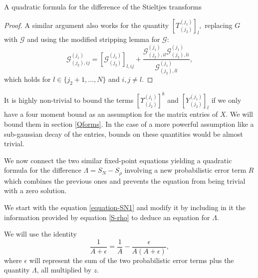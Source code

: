\documentclass[11pt, a4paper, oneside]{book}
\numberwithin{equation}{chapter}
\begin{document}
\begin{section}{A quadratic formula for the difference of the Stieltjes transforms}
\begin{proof}
%
A similar argument also works for the quantity $[{T}_{(j_2)}^{(j_1)}]_l,$ replacing  ${G}$ with $\mathcal{G}$ and using the modified stripping lemma for $\mathcal{G}:$
%
\begin{equation} \label{e:resol2}
    \mathcal{G}^{(j_1)}_{(j_2), ij} = \left [ \mathcal{G}^{(j_1)}_{(j_2)} \right ]_{l,ij} + \frac{\mathcal{G}^{(j_1)}_{(j_2), il}\mathcal{G}^{(j_1)}_{(j_2), li}}{\mathcal{G}^{(j_1)}_{(j_2), ll}},
\end{equation}
%
which holds for $l \in \{j_2+1,...,N\}$ and $i,j \neq l$.
\end{proof}
%
It is highly non-trivial to bound the terms $[\Upsilon_{(j_2)}^{(j_1)}]^k$ and $[Y_{(j_2)}^{(j_1)}]_l$ if we only have a four moment bound as an assumption for the matrix entries of $X$. We will bound them in section \ref{Qforms}. In the case of a more powerful assumption like a sub-gaussian decay of the entries, bounds on these quantities would be almost trivial.

We now connect the two similar fixed-point equations yielding a quadratic formula for the difference $\Lambda = S_N - S_{\rho}$ involving a new probabilistic error term $R$ which combines the previous ones and prevents the equation from being trivial with a zero solution.

We start with the equation \eqref{equation-SN1} and modify it by including in it the information provided by equation \eqref{S-rho} to deduce an equation for $\Lambda.$

We will use the identity
\[
\frac{1}{A+\epsilon} = \frac{1}{A} - \frac{\epsilon}{A(A+\epsilon)},
\]
where $\epsilon$ will represent the sum of the two probabilistic error terms plus the quantity $\Lambda$, all multiplied by $z$.


\end{section}
\end{document}
